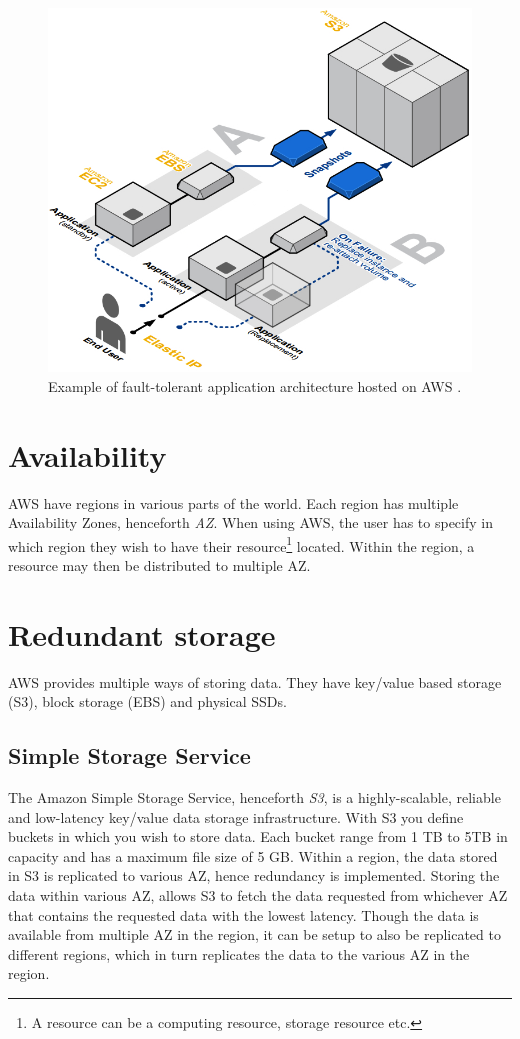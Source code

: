 \documentclass[11pt]{report}
\begin{document}
\begin{figure}[H]
\centering
\includegraphics[scale=0.55]{../GFX/aws_architecture_app.jpg}
\caption[Example of fault-tolerant application architecture hosted on AWS]{Example of fault-tolerant application architecture hosted on AWS \cite{AWS_ac_ra_ftha_04}.}
\label{fig:apparchitecture}
\end{figure}

\section{Availability}
AWS have regions in various parts of the world. Each region has multiple Availability Zones, henceforth \emph{AZ}. When using AWS, the user has to specify in which region they wish to have their resource\footnote{A resource can be a computing resource, storage resource etc.} located. Within the region, a resource may then be distributed to multiple AZ.

\section{Redundant storage}
AWS provides multiple ways of storing data. They have key/value based storage (S3), block storage (EBS) and physical SSDs.

\subsection{Simple Storage Service}
The Amazon Simple Storage Service, henceforth \emph{S3}, is a highly-scalable, reliable and low-latency key/value data storage infrastructure. With S3 you define buckets in which you wish to store data. Each bucket range from 1 TB to 5TB in capacity and has a maximum file size of 5 GB. Within a region, the data stored in S3 is replicated to various AZ, hence redundancy is implemented. Storing the data within various AZ, allows S3 to fetch the data requested from whichever AZ that contains the requested data with the lowest latency. Though the data is available from multiple AZ in the region, it can be setup to also be replicated to different regions, which in turn replicates the data to the various AZ in the region. 
\end{document}
